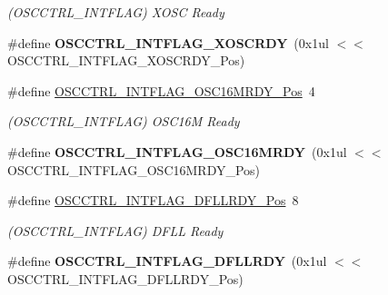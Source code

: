 \begin{DoxyCompactItemize}
\begin{DoxyCompactList}\small\item\em (O\+S\+C\+C\+T\+R\+L\+\_\+\+I\+N\+T\+F\+L\+A\+G) X\+O\+S\+C Ready \end{DoxyCompactList}\item 
\hypertarget{group___s_a_m_l21___o_s_c_c_t_r_l_ga05b1f77d3b099a3ad1ee70e0444ed8a9}{}\#define {\bfseries O\+S\+C\+C\+T\+R\+L\+\_\+\+I\+N\+T\+F\+L\+A\+G\+\_\+\+X\+O\+S\+C\+R\+D\+Y}~(0x1ul $<$$<$ O\+S\+C\+C\+T\+R\+L\+\_\+\+I\+N\+T\+F\+L\+A\+G\+\_\+\+X\+O\+S\+C\+R\+D\+Y\+\_\+\+Pos)\label{group___s_a_m_l21___o_s_c_c_t_r_l_ga05b1f77d3b099a3ad1ee70e0444ed8a9}

\item 
\hypertarget{group___s_a_m_l21___o_s_c_c_t_r_l_ga4fea001c8fcc3ded5ede5160216fa33e}{}\#define \hyperlink{group___s_a_m_l21___o_s_c_c_t_r_l_ga4fea001c8fcc3ded5ede5160216fa33e}{O\+S\+C\+C\+T\+R\+L\+\_\+\+I\+N\+T\+F\+L\+A\+G\+\_\+\+O\+S\+C16\+M\+R\+D\+Y\+\_\+\+Pos}~4\label{group___s_a_m_l21___o_s_c_c_t_r_l_ga4fea001c8fcc3ded5ede5160216fa33e}

\begin{DoxyCompactList}\small\item\em (O\+S\+C\+C\+T\+R\+L\+\_\+\+I\+N\+T\+F\+L\+A\+G) O\+S\+C16\+M Ready \end{DoxyCompactList}\item 
\hypertarget{group___s_a_m_l21___o_s_c_c_t_r_l_ga3e4cdbe84be1a15ef012cdf6b2da28a0}{}\#define {\bfseries O\+S\+C\+C\+T\+R\+L\+\_\+\+I\+N\+T\+F\+L\+A\+G\+\_\+\+O\+S\+C16\+M\+R\+D\+Y}~(0x1ul $<$$<$ O\+S\+C\+C\+T\+R\+L\+\_\+\+I\+N\+T\+F\+L\+A\+G\+\_\+\+O\+S\+C16\+M\+R\+D\+Y\+\_\+\+Pos)\label{group___s_a_m_l21___o_s_c_c_t_r_l_ga3e4cdbe84be1a15ef012cdf6b2da28a0}

\item 
\hypertarget{group___s_a_m_l21___o_s_c_c_t_r_l_ga6d6c5edd1a31c2185011f2966f4d67e7}{}\#define \hyperlink{group___s_a_m_l21___o_s_c_c_t_r_l_ga6d6c5edd1a31c2185011f2966f4d67e7}{O\+S\+C\+C\+T\+R\+L\+\_\+\+I\+N\+T\+F\+L\+A\+G\+\_\+\+D\+F\+L\+L\+R\+D\+Y\+\_\+\+Pos}~8\label{group___s_a_m_l21___o_s_c_c_t_r_l_ga6d6c5edd1a31c2185011f2966f4d67e7}

\begin{DoxyCompactList}\small\item\em (O\+S\+C\+C\+T\+R\+L\+\_\+\+I\+N\+T\+F\+L\+A\+G) D\+F\+L\+L Ready \end{DoxyCompactList}\item 
\hypertarget{group___s_a_m_l21___o_s_c_c_t_r_l_gab1795ee4b56b5abc4367b3bded9d152d}{}\#define {\bfseries O\+S\+C\+C\+T\+R\+L\+\_\+\+I\+N\+T\+F\+L\+A\+G\+\_\+\+D\+F\+L\+L\+R\+D\+Y}~(0x1ul $<$$<$ O\+S\+C\+C\+T\+R\+L\+\_\+\+I\+N\+T\+F\+L\+A\+G\+\_\+\+D\+F\+L\+L\+R\+D\+Y\+\_\+\+Pos)\label{group___s_a_m_l21___o_s_c_c_t_r_l_gab1795ee4b56b5abc4367b3bded9d152d}


\end{DoxyCompactItemize}

